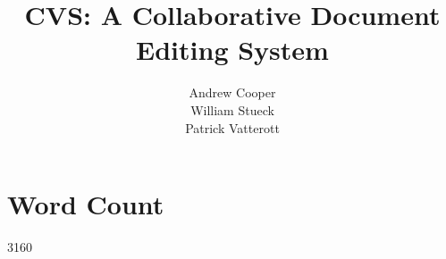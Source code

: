 \documentclass{6033dp1/6033dp1}
\title{CVS: A Collaborative Document Editing System}
\author{Andrew Cooper\\ William Stueck\\ Patrick Vatterott}
\begin{document}
\maketitle











\section{Word Count}
3160
\end{document}
